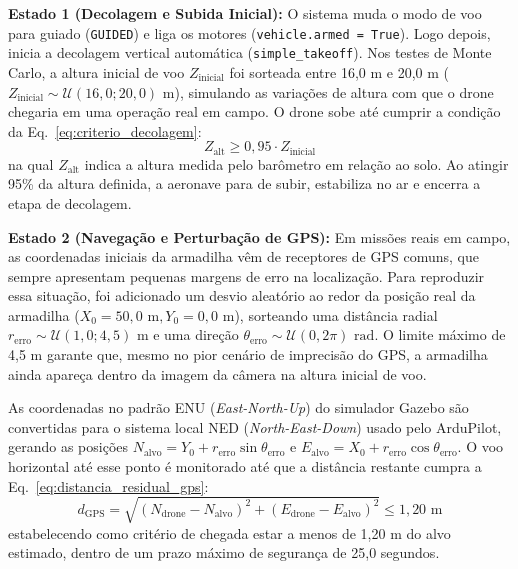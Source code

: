 \textbf{Estado 1 (Decolagem e Subida Inicial):} O sistema muda o modo de voo para guiado (\texttt{GUIDED}) e liga os motores (\texttt{vehicle.armed = True}). Logo depois, inicia a decolagem vertical automática (\texttt{simple\_takeoff}). Nos testes de Monte Carlo, a altura inicial de voo $Z_{\text{inicial}}$ foi sorteada entre 16,0 m e 20,0 m ($Z_{\text{inicial}} \sim \mathcal{U}(16,0; 20,0)\text{ m}$), simulando as variações de altura com que o drone chegaria em uma operação real em campo. O drone sobe até cumprir a condição da Eq.~\eqref{eq:criterio_decolagem}:
\begin{equation}
	Z_{\text{alt}} \ge 0,95 \cdot Z_{\text{inicial}}
	\label{eq:criterio_decolagem}
\end{equation}
na qual $Z_{\text{alt}}$ indica a altura medida pelo barômetro em relação ao solo. Ao atingir 95\% da altura definida, a aeronave para de subir, estabiliza no ar e encerra a etapa de decolagem.

\textbf{Estado 2 (Navegação e Perturbação de GPS):} Em missões reais em campo, as coordenadas iniciais da armadilha vêm de receptores de GPS comuns, que sempre apresentam pequenas margens de erro na localização. Para reproduzir essa situação, foi adicionado um desvio aleatório ao redor da posição real da armadilha ($X_0 = 50,0\text{ m}, Y_0 = 0,0\text{ m}$), sorteando uma distância radial $r_{\text{erro}} \sim \mathcal{U}(1,0; 4,5)\text{ m}$ e uma direção $\theta_{\text{erro}} \sim \mathcal{U}(0, 2\pi)\text{ rad}$. O limite máximo de 4,5 m garante que, mesmo no pior cenário de imprecisão do GPS, a armadilha ainda apareça dentro da imagem da câmera na altura inicial de voo.

As coordenadas no padrão ENU (\textit{East-North-Up}) do simulador Gazebo são convertidas para o sistema local NED (\textit{North-East-Down}) usado pelo ArduPilot, gerando as posições $N_{\text{alvo}} = Y_0 + r_{\text{erro}} \sin\theta_{\text{erro}}$ e $E_{\text{alvo}} = X_0 + r_{\text{erro}} \cos\theta_{\text{erro}}$. O voo horizontal até esse ponto é monitorado até que a distância restante cumpra a Eq.~\eqref{eq:distancia_residual_gps}:
\begin{equation}
	d_{\text{GPS}} = \sqrt{(N_{\text{drone}} - N_{\text{alvo}})^2 + (E_{\text{drone}} - E_{\text{alvo}})^2} \le 1,20\text{ m}
	\label{eq:distancia_residual_gps}
\end{equation}
estabelecendo como critério de chegada estar a menos de 1,20 m do alvo estimado, dentro de um prazo máximo de segurança de 25,0 segundos.

